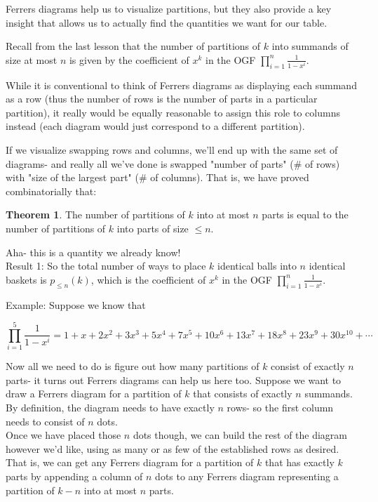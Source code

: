 \documentclass{article}
\theoremstyle{definition}
\newtheorem{theorem}{Theorem}
\begin{document}
Ferrers diagrams help us to visualize partitions, but they also provide a key insight that allows us to actually find the quantities we want for our table.

Recall from the last lesson that the number of partitions of $k$ into summands of size at most $n$ is given by the coefficient of $x^{k}$ in the OGF $\prod_{i=1}^{n} \frac{1}{1-x^{i}}$.

While it is conventional to think of Ferrers diagrams as displaying each summand as a row (thus the number of rows is the number of parts in a particular partition), it really would be equally reasonable to assign this role to columns instead (each diagram would just correspond to a different partition).

If we visualize swapping rows and columns, we'll end up with the same set of diagrams- and really all we've done is swapped "number of parts" (\# of rows) with "size of the largest part" (\# of columns). That is, we have proved combinatorially that:

\begin{theorem}
The number of partitions of $k$ into at most $n$ parts is equal to the number of partitions of $k$ into parts of size $\leq n$.
\end{theorem}

Aha- this is a quantity we already know!\\
Result 1: So the total number of ways to place $k$ identical balls into $n$ identical baskets is $p_{\leq n}(k)$, which is the coefficient of $x^{k}$ in the OGF $\prod_{i=1}^{n} \frac{1}{1-x^{i}}$.

Example: Suppose we know that

$$
\prod_{i=1}^{5} \frac{1}{1-x^{i}}=1+x+2 x^{2}+3 x^{3}+5 x^{4}+7 x^{5}+10 x^{6}+13 x^{7}+18 x^{8}+23 x^{9}+30 x^{10}+\cdots
$$


Now all we need to do is figure out how many partitions of $k$ consist of exactly $n$ parts- it turns out Ferrers diagrams can help us here too. Suppose we want to draw a Ferrers diagram for a partition of $k$ that consists of exactly $n$ summands. By definition, the diagram needs to have exactly $n$ rows- so the first column needs to consist of $n$ dots.\\


Once we have placed those $n$ dots though, we can build the rest of the diagram however we'd like, using as many or as few of the established rows as desired. That is, we can get any Ferrers diagram for a partition of $k$ that has exactly $k$ parts by appending a column of $n$ dots to any Ferrers diagram representing a partition of $k-n$ into at most $n$ parts.
\end{document}

